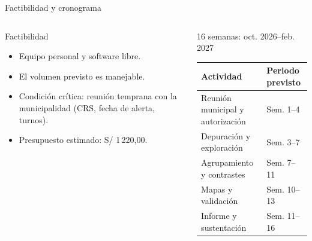 \documentclass[aspectratio=169,10pt]{beamer}
\begin{document}
\begin{frame}{Factibilidad y cronograma}
  \begin{columns}[T,onlytextwidth]
      \begin{block}{Factibilidad}
        \begin{itemize}
          \item Equipo personal y software libre.
          \item El volumen previsto es manejable.
          \item Condición crítica: reunión temprana con la municipalidad (CRS, fecha de alerta, turnos).
          \item Presupuesto estimado: S/ 1\,220,00.
        \end{itemize}
      \end{block}
      \begin{block}{16 semanas: oct. 2026--feb. 2027}
        \scriptsize
        \begin{tabular}{@{}p{2.1cm}p{2.2cm}@{}}
          \toprule
          Actividad & Periodo previsto\\
          \midrule
          Reunión municipal y autorización & Sem. 1--4\\
          Depuración y exploración & Sem. 3--7\\
          Agrupamiento y contrastes & Sem. 7--11\\
          Mapas y validación & Sem. 10--13\\
          Informe y sustentación & Sem. 11--16\\
          \bottomrule
        \end{tabular}
      \end{block}
  \end{columns}
\end{frame}
\end{document}

